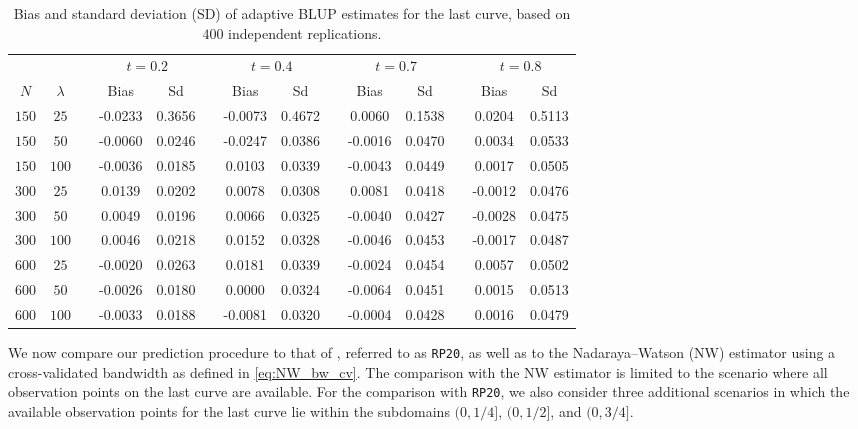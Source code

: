 \begin{table}[!tbp]
	\begin{center}
		{\small 	
			\begin{tabular}{cccccccccccccc}
				\hline
				&&&\multicolumn{2}{c}{\bfseries $t = 0.2$}&&\multicolumn{2}{c}{\bfseries $t = 0.4$}&&\multicolumn{2}{c}{\bfseries $t = 0.7$}&&\multicolumn{2}{c}{\bfseries $t = 0.8$}\\
				\cline{4-5} \cline{7-8} \cline{10-11} \cline{13-14}
				\multicolumn{1}{c}{$N$}&\multicolumn{1}{c}{$\lambda$}&&\multicolumn{1}{c}{Bias}&\multicolumn{1}{c}{Sd}&&\multicolumn{1}{c}{Bias}&\multicolumn{1}{c}{Sd}&&\multicolumn{1}{c}{Bias}&\multicolumn{1}{c}{Sd}&&\multicolumn{1}{c}{Bias}&\multicolumn{1}{c}{Sd}\tabularnewline
				\hline
				$150$&$ 25$&&-0.0233&0.3656&&-0.0073&0.4672&&0.0060&0.1538&&0.0204&0.5113\\
				$150$&$ 50$&&-0.0060&0.0246&&-0.0247&0.0386&&-0.0016&0.0470&&0.0034&0.0533\\
				$150$&$100$&&-0.0036&0.0185&&0.0103&0.0339&&-0.0043&0.0449&&0.0017&0.0505\\
				$300$&$ 25$&&0.0139&0.0202&&0.0078&0.0308&&0.0081&0.0418&&-0.0012&0.0476\\
				$300$&$ 50$&&0.0049&0.0196&&0.0066&0.0325&&-0.0040&0.0427&&-0.0028&0.0475\\
				$300$&$100$&&0.0046&0.0218&&0.0152&0.0328&&-0.0046&0.0453&&-0.0017&0.0487\\
				$600$&$ 25$&&-0.0020&0.0263&&0.0181&0.0339&&-0.0024&0.0454&&0.0057&0.0502\\
				$600$&$ 50$&&-0.0026&0.0180&&0.0000&0.0324&&-0.0064&0.0451&&0.0015&0.0513\\
				$600$&$100$&&-0.0033&0.0188&&-0.0081&0.0320&&-0.0004&0.0428&&0.0016&0.0479\\
				\hline
		\end{tabular} }
		\caption{\small Bias and standard deviation (SD) of adaptive BLUP estimates for the last curve, based on $400$ independent replications.}
		\label{tab:blup_fts_conso}
	\end{center}
\end{table}

We now compare our prediction procedure to that of \citet{rubin2020sparsely}, referred to as \texttt{RP20}, as well as to the Nadaraya–Watson (NW) estimator using a cross-validated bandwidth as defined in \eqref{eq:NW_bw_cv}. The comparison with the NW estimator is limited to the scenario where all observation points on the last curve are available. For the comparison with \texttt{RP20}, we also consider three additional scenarios in which the available observation points for the last curve lie within the subdomains $(0, 1/4]$, $(0, 1/2]$, and $(0, 3/4]$.

